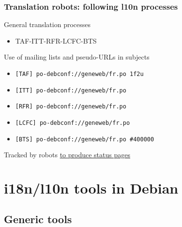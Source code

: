 \documentclass{beamer}
\begin{document}
\begin{frame}
  \frametitle{Translation robots: following l10n processes}
	\begin{block}
		{General translation processes}
		\begin{itemize}
		\item
			{TAF-ITT-RFR-LCFC-BTS}
		\end{itemize}
	\end{block}
	\begin{block}
		{Use of mailing lists and pseudo-URLs in subjects}
		\begin{itemize}
		\item
			{\texttt{[TAF] po-debconf://geneweb/fr.po 1f2u}}
		\item
			{\texttt{[ITT] po-debconf://geneweb/fr.po}}
		\item
			{\texttt{[RFR] po-debconf://geneweb/fr.po}}
		\item
			{\texttt{[LCFC] po-debconf://geneweb/fr.po}}
		\item
			{\texttt{[BTS] po-debconf://geneweb/fr.po \#400000}}
		\end{itemize}
	\end{block}
	\begin{block}
		{Tracked by robots \href{http://dutch.debian.net}{to produce status pages}}
	\end{block}
\end{frame}

\begin{frame}
  \frametitle{}
\end{frame}

\begin{frame}
  \frametitle{}
\end{frame}

\begin{frame}
  \frametitle{}
\end{frame}

\section{i18n/l10n tools in Debian}

\subsection{Generic tools}
\end{document}
